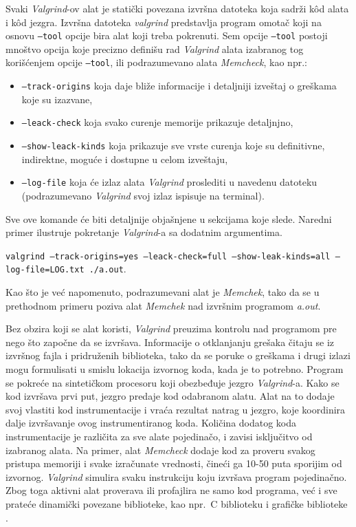 \documentclass[12pt,oneside]{memoir}
\theoremstyle{plain}
\theoremstyle{definition}
\begin{document}
Svaki \textit{Valgrind}-ov alat je statički povezana izvršna datoteka koja sadrži k\^od alata i k\^od jezgra. Izvršna datoteka \textit{valgrind} predstavlja program omotač koji na osnovu \texttt{--tool} opcije bira alat koji treba pokrenuti. Sem opcije \texttt{--tool} postoji mnoštvo opcija koje precizno definišu rad \textit{Valgrind} alata izabranog tog korišćenjem opcije \texttt{--tool}, ili podrazumevano alata \textit{Memcheck}, kao npr.:
\begin{itemize}
\item \texttt{--track-origins} koja daje bliže informacije i detaljniji izveštaj o greškama koje su izazvane, 
\item \texttt{--leack-check} koja svako curenje memorije prikazuje detaljnjno,
\item \texttt{--show-leack-kinds} koja prikazuje sve vrste curenja koje su definitivne, indirektne, moguće i dostupne u celom izveštaju,
\item \texttt{--log-file}  koja će izlaz alata \textit{Valgrind} proslediti u navedenu datoteku (podrazumevano \textit{Valgrind} svoj izlaz ispisuje na terminal).
\end{itemize} 
Sve ove komande će biti detaljnije objašnjene u sekcijama koje slede. Naredni primer ilustruje pokretanje \textit{Valgrind}-a sa dodatnim argumentima.
\begin{center}
\texttt{valgrind --track-origins=yes --leack-check=full --show-leak-kinds=all --log-file=LOG.txt ./a.out}.
\end{center}
Kao što je već napomenuto, podrazumevani alat je \textit{Memchek}, tako da se u prethodnom primeru poziva alat \textit{Memchek} nad izvršnim programom \textit{a.out}.

Bez obzira koji se alat koristi, \textit{Valgrind} preuzima kontrolu nad  programom pre nego što započne da se izvršava. Informacije o otklanjanju grešaka čitaju se iz izvršnog fajla i pridruženih biblioteka, tako da se poruke o greškama i drugi izlazi mogu formulisati u smislu lokacija izvornog koda, kada je to potrebno. Program se pokreće na sintetičkom procesoru koji obezbeđuje jezgro \textit{Valgrind}-a. Kako se kod izvršava prvi put, jezgro predaje kod odabranom alatu. Alat na to dodaje svoj vlastiti kod instrumentacije i vraća rezultat natrag u jezgro, koje koordinira dalje izvršavanje ovog instrumentiranog koda. Količina dodatog koda instrumentacije je različita za sve alate pojedinačo, i zavisi isključitvo od izabranog alata. Na primer, alat \textit{Memcheck} dodaje kod za proveru svakog pristupa memoriji i svake izračunate vrednosti, čineći ga 10-50 puta sporijim od izvornog. \textit{Valgrind} simulira svaku instrukciju koju izvršava program pojedinačno. Zbog toga aktivni alat proverava ili profajlira ne samo kod programa, već i sve prateće dinamički povezane biblioteke, kao npr.~C biblioteku i grafičke biblioteke \cite{ValgrindCore}.
\end{document}
